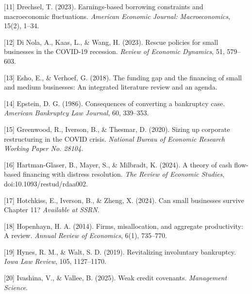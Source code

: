\documentclass[12pt]{article}
\begin{document}
\noindent
\hangindent=0.7cm
[11] Drechsel, T. (2023). Earnings-based borrowing constraints and macroeconomic fluctuations. \textit{American Economic Journal: Macroeconomics}, 15(2), 1--34.
\vspace{3mm}

\noindent
\hangindent=0.7cm
[12] Di Nola, A., Kaas, L., \& Wang, H. (2023). Rescue policies for small businesses in the COVID-19 recession. \textit{Review of Economic Dynamics}, 51, 579--603.
\vspace{3mm}

\noindent
\hangindent=0.7cm
[13] Esho, E., \& Verhoef, G. (2018). The funding gap and the financing of small and medium businesses: An integrated literature review and an agenda.
\vspace{3mm}

\noindent
\hangindent=0.7cm
[14] Epstein, D. G. (1986). Consequences of converting a bankruptcy case. \textit{American Bankruptcy Law Journal}, 60, 339--353.
\vspace{3mm}

\noindent
\hangindent=0.7cm
[15] Greenwood, R., Iverson, B., \& Thesmar, D. (2020). Sizing up corporate restructuring in the COVID crisis. \textit{National Bureau of Economic Research Working Paper No. 28104}.
\vspace{3mm}

\noindent
\hangindent=0.7cm
[16] Hartman-Glaser, B., Mayer, S., \& Milbradt, K. (2024). A theory of cash flow-based financing with distress resolution. \textit{The Review of Economic Studies}, doi:10.1093/restud/rdaa002.
\vspace{3mm}

\noindent
\hangindent=0.7cm
[17] Hotchkiss, E., Iverson, B., \& Zheng, X. (2024). Can small businesses survive Chapter 11? \textit{Available at SSRN}.
\vspace{3mm}

\noindent
\hangindent=0.7cm
[18] Hopenhayn, H. A. (2014). Firms, misallocation, and aggregate productivity: A review. \textit{Annual Review of Economics}, 6(1), 735--770.
\vspace{3mm}

\noindent
\hangindent=0.7cm
[19] Hynes, R. M., \& Walt, S. D. (2019). Revitalizing involuntary bankruptcy. \textit{Iowa Law Review}, 105, 1127--1170.
\vspace{3mm}

\noindent
\hangindent=0.7cm
[20] Ivashina, V., \& Vallee, B. (2025). Weak credit covenants. \textit{Management Science}.
\vspace{-1mm}
\end{document}
